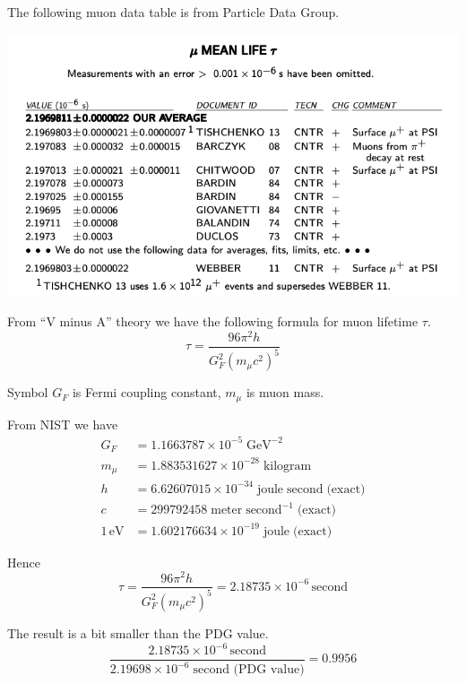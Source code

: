 \documentclass[12pt]{article}
\begin{document}
\noindent
The following muon data table is from Particle Data Group.%

\begin{center}
\includegraphics[scale=0.5]{muon-mean-life.png}
\end{center}

\noindent
From ``V minus A'' theory we have the following formula for muon lifetime $\tau$.
\begin{equation*}
\tau=\frac{96\pi^2h}{G_F^2\left(m_\mu c^2\right)^5}
\end{equation*}

\noindent
Symbol $G_F$ is Fermi coupling constant, $m_\mu$ is muon mass.

\bigskip
\noindent
From NIST we have
\begin{align*}
G_F&=1.1663787\times10^{-5}\;\text{GeV}^{-2}
\\
m_\mu&=1.883531627\times10^{-28}\;\text{kilogram}
\\
h&=6.62607015\times10^{-34}\;\text{joule}\;\text{second}\;\text{(exact)}
\\
c&=299792458\;\text{meter}\;\text{second}^{-1}\;\text{(exact)}
\\
1\,\text{eV}&=1.602176634\times10^{-19}\;\text{joule}\;\text{(exact)}
\end{align*}

\noindent
Hence
\begin{equation*}
\tau=\frac{96\pi^2h}{G_F^2\left(m_\mu c^2\right)^5}
=2.18735\times10^{-6}\,\text{second}
\end{equation*}

\noindent
The result is a bit smaller than the PDG value.
\begin{equation*}
\frac{2.18735\times10^{-6}\,\text{second}}{2.19698\times10^{-6}\;\text{second (PDG value)}}=0.9956
\end{equation*}
\end{document}
